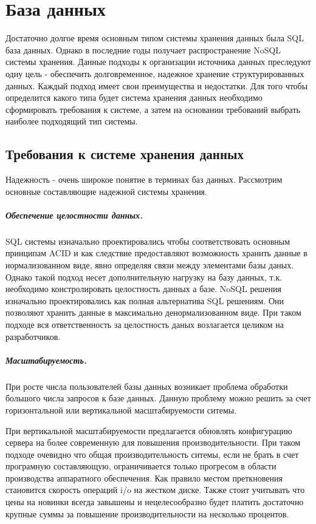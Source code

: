 \section{База данных}
Достаточно долгое время основным типом системы хранения данных была SQL база
данных. Однако в последние годы получает распространение NoSQL системы хранения.
Данные подходы к организации источника данных преследуют одну цель - обеспечить
долговременное, надежное хранение структурированных данных. Каждый подход имеет
свои преимущества и недостатки.
Для того чтобы определится какого типа будет система хранения данных необходимо
сформировать требования к системе, а затем на основании требований выбрать
наиболее подходящий тип системы.

\subsection{Требования к системе хранения данных}
Надежность - очень широкое понятие в терминах баз данных. Рассмотрим основные
составляющие надежной системы хранения.
\subparagraph{Обеспечение целостности данных.}
SQL системы изначально проектировались чтобы соответствовать основным принципам
ACID и как следствие предоставляют возможность хранить данные в нормализованном
виде, явно определяя связи между элементами базы даных. Однако такой подход
несет дополнительную нагрузку на базу данных, т.к. необходимо констролировать
целостность данных а базе.
NoSQL решения изначально проектировались как полная альтернатива SQL решениям.
Они позволяют хранить данные в максимально денормализованном виде. При таком
подходе вся ответственность за целостность даных возлагается целиком на
разработчиков.
\subparagraph{Масштабируемость.} 
При росте числа пользователей базы данных возникает проблема обработки большого
числа запросов к базе данных. Данную проблему можно решить за счет
горизонтальной или вертикальной масштабируемости ситемы.

При вертикальной масштабируемости предлагается обновлять конфигурацию сервера на
более современную для повышения производительности. При таком подходе очевидно
что общая производительность ситемы, если не брать в счет програмную
составляющую, ограничивается только прогресом в области производства аппаратного
обеспечения. Как правило местом преткновения становится скорость операций i/o на
жестком диске. Также стоит учитывать что цены на новинки всегда завышены и
нецелесообразно будет платить достаточно крупные суммы за повышение
производительности на несколько процентов.

